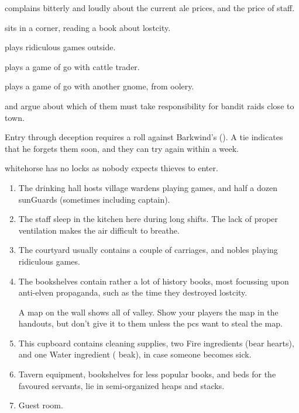 \begin{multicols}{2}
{  \begin{dlist}
    \item
     complains bitterly and loudly about the current ale prices, and the price of staff.
    \item
     sits in a corner, reading a book about \gls{lostcity}.
    \item
     plays ridiculous games outside.
    \item
     plays a game of go with  cattle trader.
    \item
     plays a game of go with another gnome, from \gls{oolery}.
    \item
     and  argue about which of them must take responsibility for bandit raids close to \gls{town}.
  \end{dlist}
}


Entry through deception requires a roll against Barkwind's  (\tn).
A tie indicates that he forgets them soon, and they can try again within a week.

\Gls{whitehorse} has no locks as nobody expects thieves to enter.
 
\begin{enumerate}
  \item
  The drinking hall hosts \gls{village} \glspl{warden} playing games, and half a dozen \glspl{sunGuard} (sometimes including \gls{captain}).
  \label{horseHall}
  \item
  \label{horseKitch}
  The staff sleep in the kitchen here during long shifts.
  The lack of proper ventilation makes the air difficult to breathe.
  \item
  \label{horseYard}
  The courtyard usually contains a couple of carriages, and nobles playing ridiculous games.
  \item
  \label{horseUpstairs}
  The bookshelves contain rather a lot of history books, most focussing upon anti-elven propaganda, such as the time they destroyed \gls{lostcity}.

  A map on the wall shows all of \gls{valley}.
  Show your players the map in the handouts, but don't give it to them unless the \glspl{pc} want to steal the map.
  \item
  \label{horseCupboard}
  This cupboard contains cleaning supplies, two Fire \glspl{ingredient} (bear hearts), and one Water \gls{ingredient} ( beak), in case someone becomes sick.
  \item
  \label{horseSideRoom}
  Tavern equipment, bookshelves for less popular books, and beds for the favoured servants, lie in semi-organized heaps and stacks.
  \item
  \label{wolfRoom}
  Guest room.
\end{enumerate}


\end{multicols}

